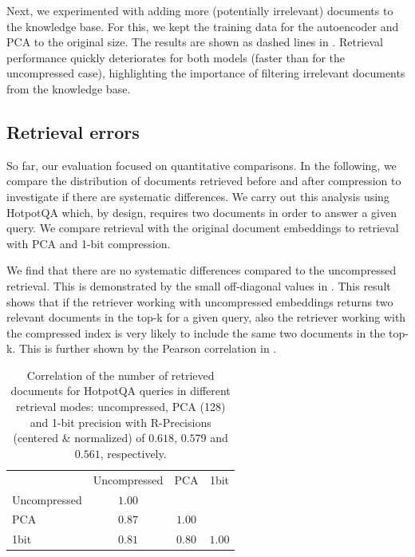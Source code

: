 Next, we experimented with adding more (potentially irrelevant) documents to the knowledge base. %
For this, we kept the training data for the autoencoder and PCA to the original size.
The results are shown as dashed lines in .
Retrieval performance quickly deteriorates for both models (faster than for the uncompressed case), highlighting the importance of filtering irrelevant documents from the knowledge base. 

\subsection{Retrieval errors}

So far, our evaluation focused on quantitative comparisons. In the following, we compare the distribution of documents retrieved before and after compression to investigate if there are systematic differences.
We carry out this analysis using HotpotQA which, by design, requires two documents in order to answer a given query.
We compare retrieval with the original document embeddings to retrieval with PCA and 1-bit compression.

We find that there are no systematic differences compared to the uncompressed retrieval.
This is demonstrated by the small off-diagonal values in .
This result shows that if the retriever working with uncompressed embeddings returns two relevant documents in the top-k for a given query, also the retriever working with the compressed index is very likely to include the same two documents in the top-k.
This is further shown by the Pearson correlation in .

\begin{table}
    \center
    \begin{tabular}{lccc}
        \toprule
        & Uncompressed & PCA & 1bit \\
        \cmidrule{2-4}
        Uncompressed & $1.00$ &  &  \\
        PCA & $0.87$ & $1.00$ &  \\
        1bit & $0.81$ & $0.80$ & $1.00$ \\
        \bottomrule
    \end{tabular}
    \caption{Correlation of the number of retrieved documents for HotpotQA queries in different retrieval modes: uncompressed, PCA (128) and 1-bit precision with R-Precisions (centered \& normalized) of $0.618$, $0.579$ and $0.561$, respectively.}
    \label{tab:hits_correlation}
\end{table}

